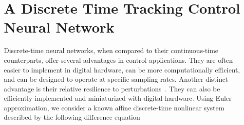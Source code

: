 \section{A Discrete Time Tracking Control Neural Network}
Discrete-time neural networks, when compared to their continuous-time counterparts,
offer several advantages in control applications. They are often easier to implement
in digital hardware, can be more computationally efficient, and can be designed to
operate at specific sampling rates. Another distinct advantage is their relative
resilience to perturbations~\cite{cichocki1993neural}. They can
also be efficiently implemented and miniaturized with digital hardware.
Using Euler approximation, we consider a known affine discrete-time nonlinear
system described by the following difference equation~\cite{tymoshchuk2023nnoptimal}\label{eq:dynamic}






